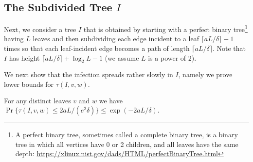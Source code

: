 \documentclass{patmorin}
\DeclareMathOperator{\exponential}{exponential}
\begin{document}

\subsection{The Subdivided Tree $I$}

Next, we consider a tree $I$ that is obtained by starting with a perfect
binary tree\footnote{A perfect binary tree, sometimes called a complete binary tree, is a binary tree in which all vertices have 0 or 2 children, and all leaves have the same depth: \url{https://xlinux.nist.gov/dads/HTML/perfectBinaryTree.html}} having $L$ leaves and then subdividing each edge incident
to a leaf $\lceil aL/\delta\rceil-1$ times so that each leaf-incident
edge becomes a path of length $\lceil aL/\delta\rceil$.  Note that $I$
has height $\lceil aL/\delta\rceil+\log_2 L-1$ (we assume $L$ is a power of 2).


We next show that the infection spreads rather slowly in $I$, namely we prove lower bounds for $\tau(I,v,w)$.


\begin{lem}
For any distinct leaves $v$ and $w$ we have
   $\Pr\{\tau(I,v,w) \le 2aL/(e^2\delta)\} \le \exp(-2aL/\delta)$.
\end{lem}
\end{document}
